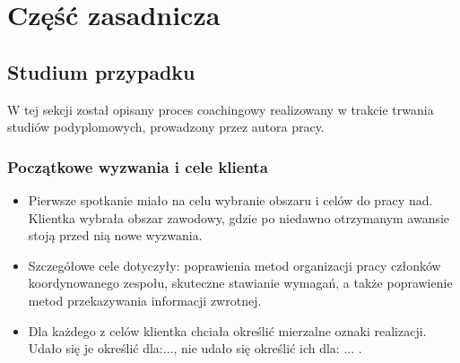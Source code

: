
\chapter{Część zasadnicza}

\section{Studium przypadku}

W tej sekcji został opisany proces coachingowy realizowany w trakcie trwania studiów podyplomowych, prowadzony przez autora pracy.

\subsection{Początkowe wyzwania i cele klienta}

\begin{itemize}
  \item Pierwsze spotkanie miało na celu wybranie obszaru i celów do pracy nad. Klientka wybrała obszar zawodowy, gdzie po niedawno otrzymanym awansie stoją przed nią nowe wyzwania.
  \item Szczegółowe cele dotyczyły: poprawienia metod organizacji pracy członków koordynowanego zespołu, skuteczne stawianie wymagań, a także poprawienie metod przekazywania informacji zwrotnej.
  \item Dla każdego z celów klientka chciała określić mierzalne oznaki realizacji. Udało się je określić dla:..., nie udało się określić ich dla: ... .
\end{itemize}

